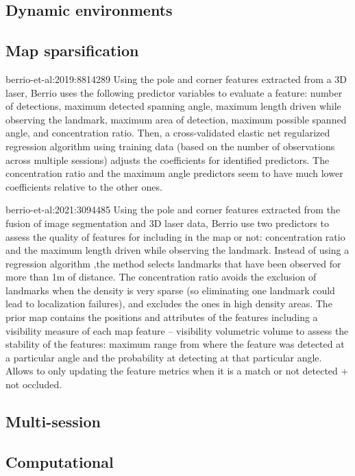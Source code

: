 \subsection{Dynamic environments}
\label{sec:discussion:dynamics}

\subsection{Map sparsification}
\label{sec:discussion:sparsify}

berrio-et-al:2019:8814289
Using the pole and corner features extracted from a 3D laser, Berrio uses the following predictor variables to evaluate a feature: number of detections, maximum detected spanning angle, maximum length driven while observing the landmark, maximum area of detection, maximum possible spanned angle, and concentration ratio.
Then, a cross-validated elastic net regularized regression algorithm using training data (based on the number of observations across multiple sessions) adjusts the coefficients for identified predictors. The concentration ratio and the maximum angle predictors seem to have much lower coefficients relative to the other ones.

berrio-et-al:2021:3094485
Using the pole and corner features extracted from the fusion of image segmentation and 3D laser data, Berrio use two predictors to assess the quality of features for including in the map or not: concentration ratio and the maximum length driven while observing the landmark. Instead of using a regression algorithm ,the method selects landmarks that have been observed for more than 1m of distance. The concentration ratio avoids the exclusion of landmarks when the density is very sparse (so eliminating one landmark could lead to localization failures), and excludes the ones in high density areas.
The prior map contains the positions and attributes of the features including a visibility measure of each map feature -- visibility volumetric volume to assess the stability of the features: maximum range from where the feature was detected at a particular angle and the probability at detecting at that particular angle. Allows to only updating the feature metrics when it is a match or not detected + not occluded.

\subsection{Multi-session}
\label{sec:discussion:multisession}

\subsection{Computational}
\label{sec:discussion:computational}


